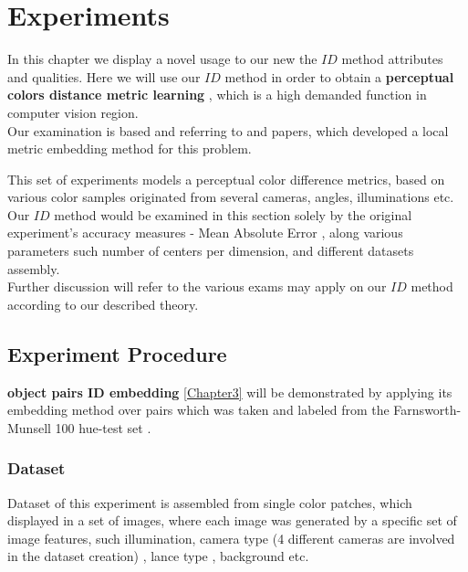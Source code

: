 
\chapter{Experiments} %

\label{Chapter8}

In this chapter we display a novel usage to our new the $ID$ method attributes and qualities. Here we will use our $ID$ method in order to obtain a \textbf{perceptual colors distance metric learning} \cite{perp_color_definition}, which is a high demanded function in computer vision region.\\ 
Our examination is based and referring to \cite{perp_color} and \cite{c2lm} papers, which developed a local metric embedding method for this problem. 

This set of experiments models a perceptual color difference metrics, based on various color samples originated from several cameras, angles, illuminations etc.
\\

Our $ID$ method would be examined in this section solely by the original experiment's accuracy measures - Mean Absolute Error \cite{MAE}, along various parameters such number of centers per dimension, and different datasets assembly.
\\
Further discussion will refer to the various exams may apply on our $ID$ method according to our described theory.

\section{Experiment Procedure}

\textbf{object pairs ID embedding} \ref{Chapter3} will be demonstrated by applying its embedding method over pairs which was taken and labeled from the Farnsworth-Munsell 100 hue-test set \cite{furnsworth}.
\subsection{Dataset}

Dataset of this experiment is assembled from single color patches, which displayed in a set of images, where each image was generated by a specific set of image features, such illumination, camera type (4 different cameras are involved in the dataset creation) , lance type , background etc.


